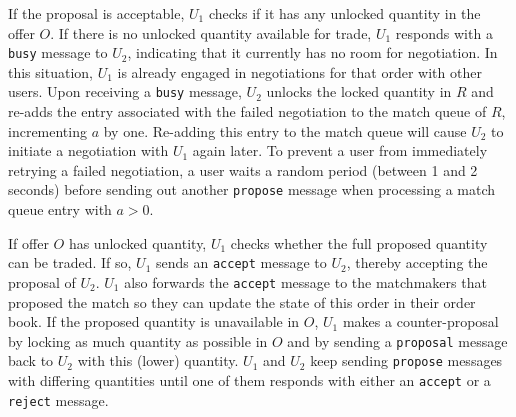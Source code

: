 If the proposal is acceptable, $ U_1 $ checks if it has any unlocked quantity in the offer $ O $.
If there is no unlocked quantity available for trade, $ U_1 $ responds with a \texttt{busy} message to $ U_2 $, indicating that it currently has no room for negotiation.
In this situation, $ U_1 $ is already engaged in negotiations for that order with other users.
Upon receiving a \texttt{busy} message, $ U_2 $ unlocks the locked quantity in $ R $ and re-adds the entry associated with the failed negotiation to the match queue of $ R $, incrementing $ a $ by one.
Re-adding this entry to the match queue will cause $ U_2 $ to initiate a negotiation with $ U_1 $ again later.
To prevent a user from immediately retrying a failed negotiation, a user waits a random period (between 1 and 2 seconds) before sending out another \texttt{propose} message when processing a match queue entry with $ a > 0 $.

If offer $ O $ has unlocked quantity, $ U_1 $ checks whether the full proposed quantity can be traded.
If so, $ U_1 $ sends an \texttt{accept} message to $ U_2 $, thereby accepting the proposal of $ U_2 $.
$ U_1 $ also forwards the \texttt{accept} message to the matchmakers that proposed the match so they can update the state of this order in their order book.
If the proposed quantity is unavailable in $ O $, $ U_1 $ makes a counter-proposal by locking as much quantity as possible in $ O $ and by sending a \texttt{proposal} message back to $ U_2 $ with this (lower) quantity.
$ U_1 $ and $ U_2 $ keep sending \texttt{propose} messages with differing quantities until one of them responds with either an \texttt{accept} or a \texttt{reject} message.



